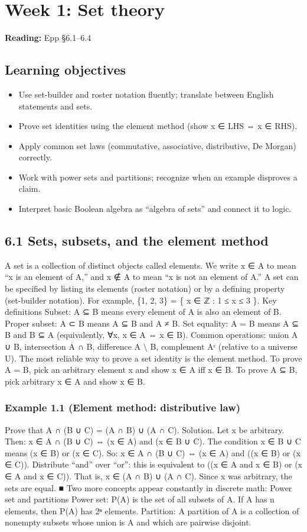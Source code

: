\documentclass[11pt]{article}
\begin{document}
\tableofcontents
\clearpage
\clearpage
\section{Week 1: Set theory}
\textbf{Reading:} Epp §6.1–6.4
\subsection*{Learning objectives}
\begin{itemize}[leftmargin=*,itemsep=0.25em]
\item Use set-builder and roster notation fluently; translate between English statements and sets.
\item Prove set identities using the element method (show x ∈ LHS ⇔ x ∈ RHS).
\item Apply common set laws (commutative, associative, distributive, De Morgan) correctly.
\item Work with power sets and partitions; recognize when an example disproves a claim.
\item Interpret basic Boolean algebra as “algebra of sets” and connect it to logic.
\end{itemize}
\subsection{6.1 Sets, subsets, and the element method}
A set is a collection of distinct objects called elements. We write x ∈ A to mean “x is an
element of A,” and x ∉ A to mean “x is not an element of A.”
A set can be specified by listing its elements (roster notation) or by a defining property
(set-builder notation). For example, \{1, 2, 3\} = \{ x ∈ ℤ : 1 ≤ x ≤ 3 \}.
Key definitions
Subset: A ⊆ B means every element of A is also an element of B.
Proper subset: A ⊂ B means A ⊆ B and A ≠ B.
Set equality: A = B means A ⊆ B and B ⊆ A (equivalently, ∀x, x ∈ A ⇔ x ∈ B).
Common operations: union A ∪ B, intersection A ∩ B, difference A \(\setminus\) B, complement Aᶜ
(relative to a universe U).
The most reliable way to prove a set identity is the element method. To prove A = B, pick
an arbitrary element x and show x ∈ A iff x ∈ B. To prove A ⊆ B, pick arbitrary x ∈ A and
show x ∈ B.

\subsubsection*{Example 1.1 (Element method: distributive law)}
Prove that A ∩ (B ∪ C) = (A ∩ B) ∪ (A ∩ C).
Solution. Let x be arbitrary. Then:
x ∈ A ∩ (B ∪ C) ⇔ (x ∈ A) and (x ∈ B ∪ C).
The condition x ∈ B ∪ C means (x ∈ B) or (x ∈ C). So:
x ∈ A ∩ (B ∪ C) ⇔ (x ∈ A) and ((x ∈ B) or (x ∈ C)).
Distribute “and” over “or”: this is equivalent to ((x ∈ A and x ∈ B) or (x ∈ A and x
∈ C)).
That is, x ∈ (A ∩ B) ∪ (A ∩ C). Since x was arbitrary, the sets are equal. ■
Two more concepts appear constantly in discrete math:
Power set and partitions
Power set: P(A) is the set of all subsets of A. If A has n elements, then P(A) has 2ⁿ
elements.
Partition: A partition of A is a collection of nonempty subsets whose union is A and
which are pairwise disjoint.
\end{document}
